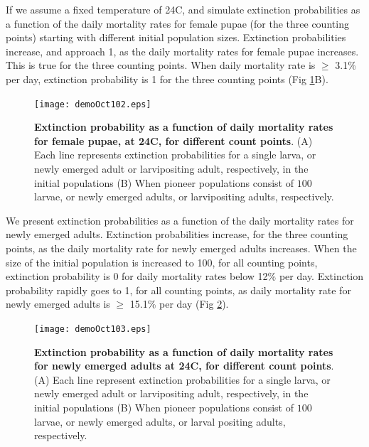  If we assume a fixed temperature of 24\degree C, and simulate extinction probabilities  as a function of the daily mortality rates for female pupae (for the three counting points) starting with different initial population sizes. Extinction probabilities increase, and approach 1, as the daily mortality rates for female pupae increases. This is true for the three counting points. When daily mortality rate is $\geq$ 3.1\% per day, extinction probability is 1 for the three counting points (Fig \ref{fig:3}B).   



\begin{figure}[h]
	\texttt{[image: demoOct102.eps]}
		\caption{{\bf Extinction probability as a function of daily mortality rates for female pupae, at 24\degree C, for different count points}. (A) Each line represents extinction probabilities for a single larva, or newly emerged adult or larvipositing adult, respectively, in the initial populations (B) When pioneer populations consist of  $100$ larvae,  or newly emerged adults, or larvipositing adults, respectively.}
	\label{fig:3}       %
\end{figure}
%

We present extinction probabilities as a function of the daily mortality rates for newly emerged adults. Extinction probabilities increase, for the three counting points, as the daily mortality rate for newly emerged adults increases. When the size of the initial population is increased to 100, for all counting points, extinction probability is 0 for daily mortality rates below 12\% per day. Extinction probability rapidly goes to 1, for all counting points, as daily mortality rate for newly emerged adults is $\geq$ 15.1\% per day (Fig \ref{fig:4}).
   


\begin{figure}[h]
	\texttt{[image: demoOct103.eps]}
	\caption{{\bf Extinction probability as a function of daily mortality rates for newly emerged adults at 24\degree C, for different count points}. (A) Each line represent extinction probabilities for a single larva, or  newly emerged adult or larvipositing adult, respectively,  in the initial populations (B) When pioneer populations consist of  $100$ larvae,  or newly emerged adults, or larval positing adults, respectively.}
	\label{fig:4}       %
\end{figure}
%

